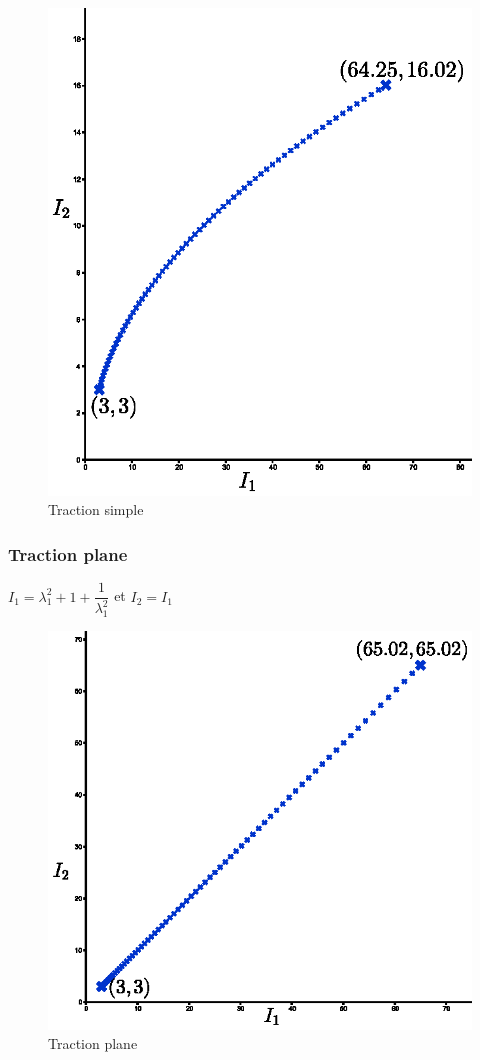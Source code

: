 \documentclass[a4paper,11pt]{article}
\begin{document}
\begin{figure}[!ht]
\centering\includegraphics[scale=0.7]{scilab/q2-6-1.eps}
\caption{Traction simple}
\label{fig:tract_simple}
\end{figure}

\subsubsection{Traction plane}
$I_1=\lambda_1^2+1+\dfrac{1}{\lambda_1^2}$ et $I_2=I_1$

\begin{figure}[!ht]
\centering\includegraphics[scale=0.8]{scilab/q2-6-2.eps}
\caption{Traction plane}
\label{fig:tract_plane}
\end{figure}
\end{document}
